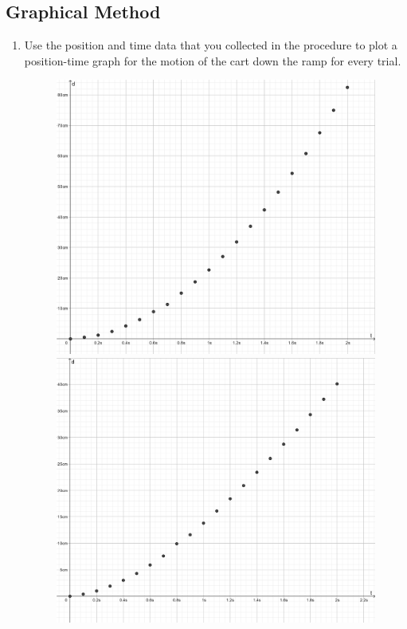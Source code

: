 \documentclass[12pt]{article}
\begin{document}
\subsection{Graphical Method}
\begin{enumerate}
    \item Use the position and time data that you collected in the procedure to plot a position-time graph for the motion of the cart down the ramp for every trial.
    \begin{figure}[H]
        \centering
        \begin{minipage}{0.4\textwidth}
            \centering
            \includegraphics[scale=2]{LabReportImg/5TB.png}
        \end{minipage}
        \begin{minipage}{0.4\textwidth}
            \centering
            \includegraphics[scale=2]{LabReportImg/3TB.png}

\end{minipage}
\end{figure}
\end{enumerate}
\end{document}
